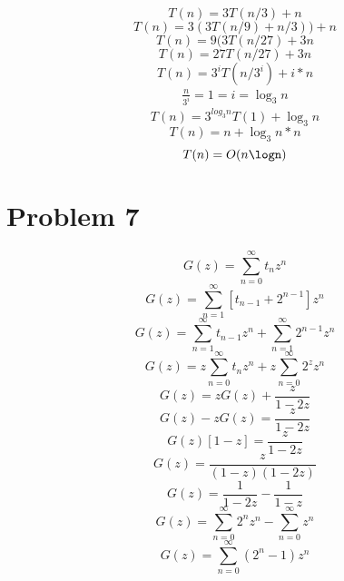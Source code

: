 \documentclass[letterpaper,oneside,10pt]{article}
\begin{document}
\begin{equation*}
T(n) = 3T(n/3) + n
\end{equation*}
\begin{equation*}
T(n) = 3(3T(n/9)+n/3))+n
\end{equation*}
\begin{equation*}
T(n) = 9(3T(n/27) + 3n
\end{equation*}
\begin{equation*}
T(n) = 27T(n/27) + 3n
\end{equation*}
\begin{equation*}
T(n) = 3^{i}T(n/3^{i})+i*n
\end{equation*}
\begin{gather*}
\frac{n}{3^{i}} = 1 = i = \log_{3}n
\end{gather*}
\begin{equation*}
T(n) = 3^{log_{3}n}T(1)+\log_{3}n
\end{equation*}
\begin{equation*}
T(n) = n+\log_{3}n*n
\end{equation*}
\begin{equation*}
T(n) = O(n\logn)
\end{equation*}

\section{Problem 7}
\label{sec:Problem 7}

\begin{equation*}
G(z)=\sum_{n=0}^{\infty} t_{n}z^{n}
\end{equation*}
\begin{equation*}
G(z)=\sum_{n=1}^{\infty}[t_{n-1}+2^{n-1}]z^n
\end{equation*}
\begin{equation*}
G(z) = \sum_{n=1}^{\infty}t_{n-1}z^n + \sum_{n=1}^{\infty}2^{n-1}z^{n}
\end{equation*}
\begin{equation*}
G(z) = z\sum_{n=0}^{\infty}t_{n}z^{n}+z\sum_{n=0}^{\infty}2^{z}z^{n}
\end{equation*}
\begin{equation*}
G(z) = zG(z) + \frac{z}{1-2z}
\end{equation*}
\begin{equation*}
G(z) - zG(z) = \frac{z}{1-2z}
\end{equation*}
\begin{equation*}
G(z)[1-z]=\frac{z}{1-2z}
\end{equation*}
\begin{equation*}
G(z) = \frac{z}{(1-z)(1-2z)}
\end{equation*}
\begin{equation*}
G(z) = \frac{1}{1-2z} - \frac{1}{1-z}
\end{equation*}
\begin{equation*}
G(z) = \sum_{n=0}^{\infty}2^{n}z^{n}-\sum_{n=0}^{\infty}z^{n}
\end{equation*}
\begin{equation*}
G(z) = \sum_{n=0}^{\infty}(2^{n}-1)z^{n}
\end{equation*}
\end{document}
